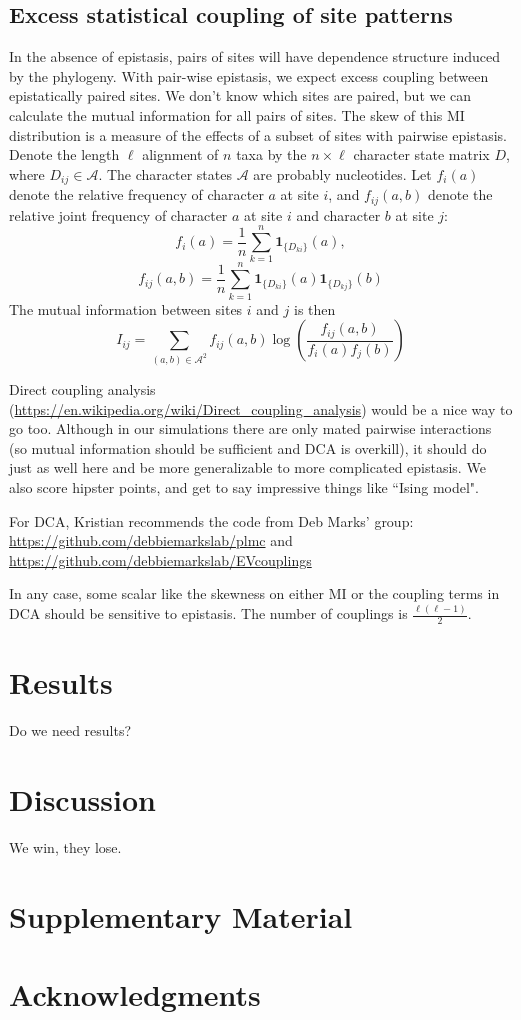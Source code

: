 \documentclass[11pt]{article}
\begin{document}
\subsection*{Excess statistical coupling of site patterns}

In the absence of epistasis, pairs of sites will have dependence structure induced by the phylogeny.
With pair-wise epistasis, we expect excess coupling between epistatically paired sites.
We don't know which sites are paired, but we can calculate the mutual information for all pairs of sites.
The skew of this MI distribution is a measure of the effects of a subset of sites with pairwise epistasis.
Denote the length $\ell$ alignment of $n$ taxa by the $n\times\ell$ character state matrix $D$, where $D_{ij}\in\mathcal{A}$.
The character states $\mathcal{A}$ are probably nucleotides.
Let $f_i(a)$ denote the relative frequency of character $a$ at site $i$, and $f_{ij}(a,b)$ denote the relative joint frequency of character $a$ at site $i$ and character $b$ at site $j$:
\[
f_i(a) = \frac{1}{n}\sum_{k=1}^{n}\boldsymbol{1}_{\{D_{ki}\}}(a),
\]
\[
f_{ij}(a,b) = \frac{1}{n}\sum_{k=1}^{n}\boldsymbol{1}_{\{D_{ki}\}}(a) \boldsymbol{1}_{\{D_{kj}\}}(b)
\]
The mutual information between sites $i$ and $j$ is then
\[
I_{ij} = \sum_{(a,b)\in\mathcal{A}^2}f_{ij}(a,b)\log\left(\frac{f_{ij}(a,b)}{f_i(a)f_j(b)}\right)
\]

Direct coupling analysis (\url{https://en.wikipedia.org/wiki/Direct_coupling_analysis}) would be a nice way to go too.
Although in our simulations there are only mated pairwise interactions (so mutual information should be sufficient and DCA is overkill), it should do just as well here and be more generalizable to more complicated epistasis.
We also score hipster points, and get to say impressive things like ``Ising model".

For DCA, Kristian recommends the code from Deb Marks' group: \url{https://github.com/debbiemarkslab/plmc} and \url{https://github.com/debbiemarkslab/EVcouplings}

In any case, some scalar like the skewness on either MI or the coupling terms in DCA should be sensitive to epistasis.
The number of couplings is $\frac{\ell(\ell-1)}{2}$.


\section*{Results\label{sec:results}}

Do we need results?

\section*{Discussion\label{sec:discussion}}

We win, they lose.

\section*{Supplementary Material}



\section*{Acknowledgments}




\end{document}
